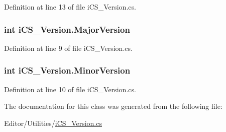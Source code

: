 Definition at line 13 of file i\+C\+S\+\_\+\+Version.\+cs.

\hypertarget{classi_c_s___version_ad0baa9814c3b5593ead592c8e75c65fa}{
\subsubsection[{Major\+Version}]{\setlength{\rightskip}{0pt plus 5cm}int i\+C\+S\+\_\+\+Version.\+Major\+Version}}\label{classi_c_s___version_ad0baa9814c3b5593ead592c8e75c65fa}


Definition at line 9 of file i\+C\+S\+\_\+\+Version.\+cs.

\hypertarget{classi_c_s___version_a7b5bf7f3f699f3e42eb538f1429e3099}{
\subsubsection[{Minor\+Version}]{\setlength{\rightskip}{0pt plus 5cm}int i\+C\+S\+\_\+\+Version.\+Minor\+Version}}\label{classi_c_s___version_a7b5bf7f3f699f3e42eb538f1429e3099}


Definition at line 10 of file i\+C\+S\+\_\+\+Version.\+cs.



The documentation for this class was generated from the following file\+:\begin{DoxyCompactItemize}
\item 
Editor/\+Utilities/\hyperlink{i_c_s___version_8cs}{i\+C\+S\+\_\+\+Version.\+cs}\end{DoxyCompactItemize}

